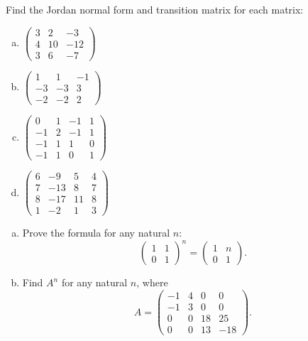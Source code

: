 \begin{problem}
Find the Jordan normal form and transition matrix for each matrix:
\begin{enumerate}[(a)]
    \item $\begin{pmatrix} 3 & 2 & -3 \\ 4 & 10 & -12 \\ 3 & 6 & -7 \end{pmatrix}$
    \item $\begin{pmatrix} 1 & 1 & -1 \\ -3 & -3 & 3 \\ -2 & -2 & 2 \end{pmatrix}$
    \item $\begin{pmatrix} 0 & 1 & -1 & 1 \\ -1 & 2 & -1 & 1 \\ -1 & 1 & 1 & 0 \\ -1 & 1 & 0 & 1 \end{pmatrix}$
    \item $\begin{pmatrix} 6 & -9 & 5 & 4 \\ 7 & -13 & 8 & 7 \\ 8 & -17 & 11 & 8 \\ 1 & -2 & 1 & 3 \end{pmatrix}$
\end{enumerate}
\end{problem}

\begin{problem}
\begin{enumerate}[(a)] 
\item Prove the formula for any natural $n$:
$$
\begin{pmatrix}
1 & 1\\
0 & 1
\end{pmatrix}^n = \begin{pmatrix}
1 & n\\
0 & 1
\end{pmatrix}.
$$
\item Find $A^n$ for any natural $n$, where
$$
A = \begin{pmatrix} -1 & 4 & 0 & 0 \\ -1 & 3 & 0 & 0 \\ 0 & 0 & 18 & 25 \\ 0 & 0 & 13 & -18 \end{pmatrix}.
$$
\end{enumerate}
\end{problem}